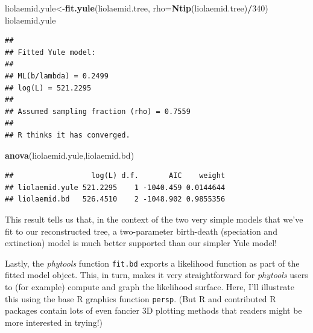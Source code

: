 \documentclass[fleqn,10pt,lineno]{wlpeerj} %
\newenvironment{Shaded}{\begin{snugshade}}{\end{snugshade}}
\newcommand{\AttributeTok}[1]{\textcolor[rgb]{0.13,0.29,0.53}{#1}}
\newcommand{\DecValTok}[1]{\textcolor[rgb]{0.00,0.00,0.81}{#1}}
\newcommand{\FunctionTok}[1]{\textcolor[rgb]{0.13,0.29,0.53}{\textbf{#1}}}
\newcommand{\NormalTok}[1]{#1}
\newcommand{\OtherTok}[1]{\textcolor[rgb]{0.56,0.35,0.01}{#1}}
\newcommand{\SpecialCharTok}[1]{\textcolor[rgb]{0.81,0.36,0.00}{\textbf{#1}}}
\begin{document}
\begin{Shaded}
\begin{Highlighting}[]
\NormalTok{liolaemid.yule}\OtherTok{\textless{}{-}}\FunctionTok{fit.yule}\NormalTok{(liolaemid.tree,}
  \AttributeTok{rho=}\FunctionTok{Ntip}\NormalTok{(liolaemid.tree)}\SpecialCharTok{/}\DecValTok{340}\NormalTok{)}
\NormalTok{liolaemid.yule}
\end{Highlighting}
\end{Shaded}

\begin{verbatim}
## 
## Fitted Yule model:
## 
## ML(b/lambda) = 0.2499 
## log(L) = 521.2295 
## 
## Assumed sampling fraction (rho) = 0.7559 
## 
## R thinks it has converged.
\end{verbatim}

\begin{Shaded}
\begin{Highlighting}[]
\FunctionTok{anova}\NormalTok{(liolaemid.yule,liolaemid.bd)}
\end{Highlighting}
\end{Shaded}

\begin{verbatim}
##                  log(L) d.f.       AIC    weight
## liolaemid.yule 521.2295    1 -1040.459 0.0144644
## liolaemid.bd   526.4510    2 -1048.902 0.9855356
\end{verbatim}

This result tells us that, in the context of the two very simple models that we've fit to our reconstructed tree, a two-parameter birth-death (speciation and extinction) model is much better supported than our simpler Yule model!

Lastly, the \emph{phytools} function \texttt{fit.bd} exports a likelihood function as part of the fitted model object. This, in turn, makes it very straightforward for \emph{phytools} users to (for example) compute and graph the likelihood surface. Here, I'll illustrate this using the base R graphics function \texttt{persp}. (But R and contributed R packages contain lots of even fancier 3D plotting methods that readers might be more interested in trying!)
\end{document}
